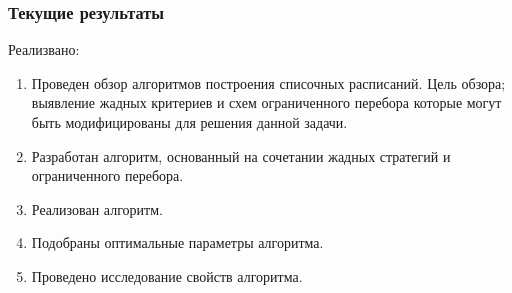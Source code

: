 \begin{frame}
    \frametitle{Текущие результаты}
    Реализвано:
    \begin{enumerate}
        \item Проведен обзор алгоритмов построения списочных расписаний. Цель обзора; выявление жадных критериев и схем ограниченного перебора которые могут быть модифицированы для решения данной задачи.
        \item Разработан алгоритм, основанный на сочетании жадных стратегий и ограниченного перебора.
        \item Реализован алгоритм.
        \item Подобраны оптимальные параметры алгоритма.
        \item Проведено исследование свойств алгоритма.
    \end{enumerate}
\end{frame}